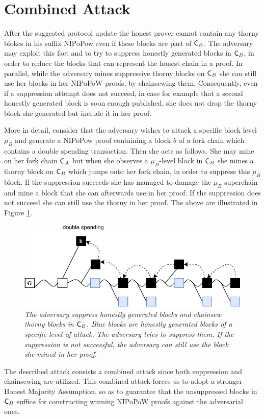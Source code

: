 \section{Combined Attack}
After the suggested protocol update the honest prover cannot contain any thorny blokcs in his suffix NIPoPow even if these blocks are part of $\mathsf{C}_B$.  The adversary may exploit this fact and to try to suppress honestly generated blocks in $\mathsf{C}_B$, in order to reduce the blocks that can represent the honest chain in a proof. In parallel, while the adversary mines suppressive thorny blocks on $\mathsf{C}_B$ she can still use her blocks in her NIPoPoW proofs, by chainsewing them. Consequently, even if a suppression attempt does not succeed, in case for example that a second honestly generated block is soon enough published, she does not drop the thorny block she generated but include it in her proof.

More in detail, consider that the adversary wishes to attack a specific block level $\mu_B$ and generate a NIPoPow proof containing a block $b$ of a fork chain which contains a double spending transaction. Then she acts as follows. She may mine on her fork chain $\mathsf{C}_\mathcal{A}$ but when she observes a $\mu_B$-level block in $\mathsf{C}_B$ she mines a thorny block on $\mathsf{C}_B$ which jumps onto her fork chain, in order to suppress this $\mu_B$ block. If the suppression succeeds she has managed to damage the $\mu_B$ superchain and mine a block that she can afterwards use in her proof. If the suppression does not succeed she can still use the thorny in her proof. The above are illustrated in Figure \ref{fig:attack_after_update}.

\begin{figure}[h!]
	\begin{center}
    \includegraphics[scale=0.65]{figures/attack_after_update-crop.pdf}
	\end{center}
	\caption{\textit{The adversary suppress honestly generated blocks and chainsew thorny blocks in $\mathsf{C}_B$. Blue blocks are honestly generated blocks of a specific level of attack. The adversary tries to suppress them. If the suppression is not successful, the adversary can still use the block she mined in her proof.}}
	\label{fig:attack_after_update}
\end{figure}

The described attack consists a combined attack since both suppression and chainsewing are utilized. This combined attack forces us to adopt a stronger Honest Majority Assumption, so as to guarantee that the unsuppressed blocks in $\mathsf{C}_B$ suffice for constructing winning NIPoPoW proofs against the adversarial ones.
